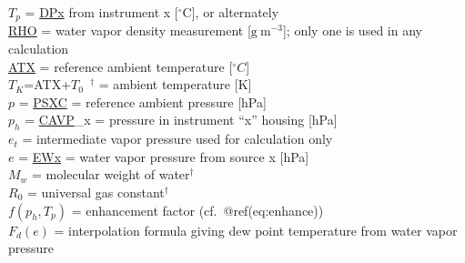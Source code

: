 \documentclass[
  english,
]{book}
\begin{document}
\(T_{p}\) = \protect\hyperlink{dew-point}{DPx} from instrument x
{[}\(^{\circ}\)C{]}, or alternately\\
\protect\hyperlink{rho}{RHO} = water vapor density measurement
{[}\(\mathrm{g\ }\mathrm{m}^{-3}\){]}; only one is used in any
calculation\\
\protect\hyperlink{ambient-t}{ATX} = reference ambient temperature
{[}\(^{\circ}C\){]}\\
\(T_{K}\)=ATX+\(T_{0}\)~\(^{\dagger}\) = ambient temperature {[}K{]}\\
\(p\) = \protect\hyperlink{psx}{PSXC} = reference ambient pressure
{[}hPa{]}\\
\(p_{h}\) = \protect\hyperlink{p-special}{CAVP}\_x = pressure in
instrument ``x'' housing {[}hPa{]}\\
\(e_{t}\) = intermediate vapor pressure used for calculation only\\
\(e\) = \protect\hyperlink{ewx}{EWx} = water vapor pressure from source
x {[}hPa{]}\\
\(M_{w}\) = molecular weight of water\(^{\dagger}\)\\
\(R_{0}\) = universal gas constant\(^{\dagger}\)\\
\(f(p_{h},T_{p})\) = enhancement factor (cf.~@ref(eq:enhance))\\
\(F_{d}(e)\) = interpolation formula giving dew point temperature from
water vapor pressure
\end{document}
